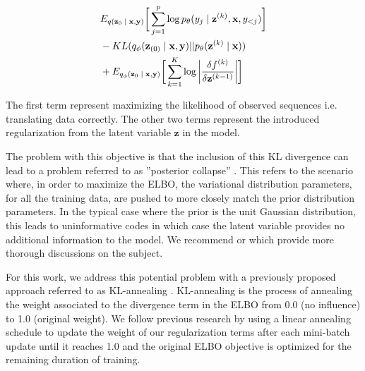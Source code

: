 \begin{align}
\begin{split}\label{eq:2}
&
E_{q(\textbf{z}_{0}\; | \;{\textbf{x}, \textbf{y}})} \bigg[ \sum_{j=1}^{p} \log p_{\theta}(y_{j} \; | \;{\textbf{z}^{(k)}}, \textbf{x}, y_{<j}) \bigg] \\
& - KL(q_{\phi}(\textbf{z}_{(0)} \; | \;{\textbf{x}, \textbf{y}}) || p_{\theta}(\textbf{z}^{(k)} \; | \;{\textbf{x}})) \\
&   +  E_{q_{\phi}(\textbf{z}_{0} \; | \;{\textbf{x}, \textbf{y}})} \bigg[\sum_{k=1}^{K} \log \bigg|\frac{\delta f^{(k)}}{\delta \textbf{z}^{(k-1)}} \bigg| \bigg]  
\end{split}
\end{align}

The first term represent maximizing the likelihood of observed sequences i.e. translating data correctly. The other two terms represent the introduced regularization from the latent variable $\textbf{z}$ in the model. 

The problem with this objective is that the inclusion of this KL divergence can lead to a problem referred to as ''posterior collapse'' \cite{he2018lagging}. This refers to the scenario where, in order to maximize the ELBO, the variational distribution parameters, for all the training data, are pushed to more closely match the prior distribution parameters. In the typical case where the prior is the unit Gaussian distribution, this leads to uninformative codes in which case the latent variable provides no additional information to the model. We recommend \citet{chen2016VariationalLossyAE} or \citet{zhao2017InfoVAE} which provide more thorough discussions on the subject. 

 

For this work, we address this potential problem with a previously proposed approach referred to as KL-annealing \cite{bowman2015GeneratingSent,sonderby2016LadderVAE}. KL-annealing is the process of annealing the weight associated to the divergence term in the ELBO from 0.0 (no influence) to 1.0 (original weight). We follow previous research by using a linear annealing schedule to update the weight of our regularization terms after each mini-batch update until it reaches 1.0 and the original ELBO objective is optimized for the remaining duration of training. 


